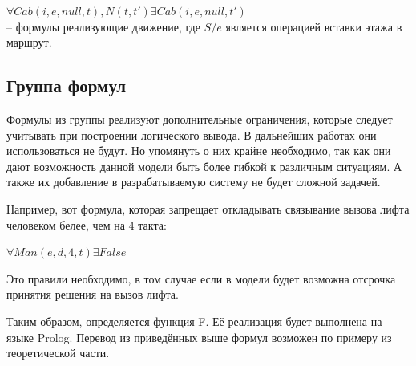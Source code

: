 	$ \forall Cab(i, e, null, t), N(t, t')\exists Cab(i, e, null, t')$\\

	-- формулы реализующие движение, где $S / e$ является операцией вставки этажа в маршрут.

	\subsection{Группа формул \Phi}

	Формулы из группы \Phi реализуют дополнительные ограничения, которые следует учитывать при 
	построении логического вывода. В дальнейших работах они использоваться не будут. Но упомянуть о них
	крайне необходимо, так как они дают возможность данной модели быть более гибкой к различным ситуациям.
	А также их добавление в разрабатываемую систему не будет сложной задачей.

	Например, вот формула, которая запрещает откладывать связывание вызова лифта человеком белее, чем на 4 такта:

	$ \forall Man(e, d, 4, t)\exists False$

	Это правили необходимо, в том случае если в модели будет возможна отсрочка принятия решения на вызов лифта.

	Таким образом, определяется функция F. Её реализация будет выполнена на языке Prolog. Перевод из приведённых
	выше формул возможен по примеру из теоретической части.
